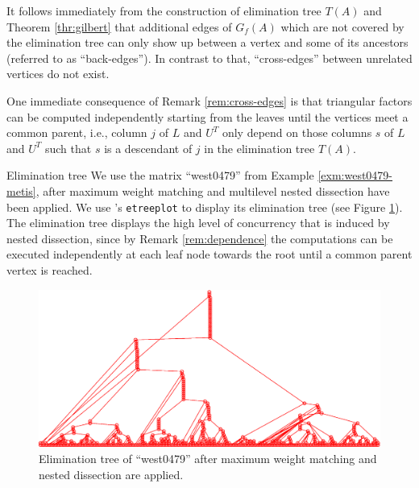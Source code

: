 \begin{remark}\label{rem:cross-edges}
It follows immediately from the construction of elimination tree $T(A)$ and Theorem
\ref{thr:gilbert}
that additional edges of $G_f(A)$ which are not covered by the elimination
tree can only show up between a vertex and some of its ancestors (referred to as ``back-edges''). In contrast to that, ``cross-edges'' between unrelated vertices
do not exist.
\end{remark}

\begin{remark}\label{rem:dependence}
One immediate consequence of Remark \ref{rem:cross-edges} is
that triangular factors can be computed independently starting from the
leaves until the vertices meet a common parent, i.e.,
column $j$ of $L$ and $U^T$ only depend on those columns $s$
of $L$ and $U^T$ such that $s$ is a descendant
of $j$ in the elimination tree $T(A)$.
\end{remark}

\begin{example}{Elimination tree}\label{exm:etree}
We use the matrix ``west0479'' from Example \ref{exm:west0479-metis},
after maximum weight matching and multilevel nested dissection have
been applied. We use \ml's \texttt{etreeplot} to display its elimination
tree (see Figure \ref{fig:etreeplot}). The elimination tree displays the high
level of concurrency that is induced by nested dissection, since 
by Remark \ref{rem:dependence} the computations can be executed independently
at each leaf node towards the root until a common parent vertex is reached.
\end{example}
\begin{figure}
{
\begin{minipage}{.99\textwidth}
\includegraphics[width=\textwidth,height=0.3\textwidth]{figures/west0479-match-metis-etree}
\end{minipage}
}
\caption{Elimination tree of ``west0479'' after maximum weight matching and nested dissection are applied.}\label{fig:etreeplot}
\end{figure}





